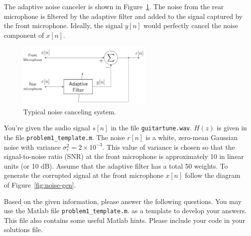 \documentclass[12pt]{report}
\begin{document}
The adaptive noise canceler is shown in Figure~\ref{fig:noise-cancel}. The noise from the rear microphone is filtered by the adaptive filter and added to the signal captured by the front microphone. Ideally, the signal $y[n]$ would perfectly cancel the noise component of $x[n]$.

\begin{figure}[!h]
	\centering
	\includegraphics[width=0.6\textwidth]{figs/noise_cancelling.png}
	\caption{Typical noise canceling system.} \label{fig:noise-cancel}
\end{figure}

You're given the audio signal $s[n]$ in the file \texttt{guitartune.wav}. $H(z)$ is given in the file \texttt{problem1\_template.m}. The noise $r[n]$ is a white, zero-mean Gaussian noise with variance $\sigma^2_r = 2\times 10^{-3}$. This value
of variance is chosen so that the signal-to-noise ratio (SNR) at the front microphone is approximately 10 in linear units (or 10 dB). Assume that the adaptive filter has a total 50 weights. To generate the corrupted signal at the front microphone $x[n]$ follow the diagram of Figure~\ref{fig:noise-gen}.

Based on the given information, please answer the following questions. You may use the
Matlab file \texttt{problem1\_template.m}. as a template to develop your answers. This file also contains some useful Matlab hints. Please include your code in your solutions file.
\end{document}
